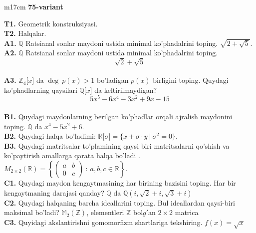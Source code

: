 \documentclass{article}
\begin{document}
\begin{tabular}{m{17cm}}
\textbf{75-variant}
\newline

\textbf{T1.} Geometrik konstruksiyasi. \\
\textbf{T2.} Halqalar. \\
\textbf{A1.} \(\mathbb{Q}\) Ratsianal sonlar maydoni ustida minimal ko'phadalrini toping.
\(\sqrt{2 + \sqrt{5}}\). \\
\textbf{A2.} \(\mathbb{Q}\) Ratsianal sonlar maydoni ustida minimal ko'phadalrini toping.
\[\sqrt{2} + \sqrt{5}\] \\
\textbf{A3.} \(\mathbb{Z}_{4}\lbrack x\rbrack\) da \(\deg\ p(x) > 1\) bo'ladigan \(p(x)\) birligini toping. Quydagi ko'phadlarning qaysilari \(\mathbb{Q\lbrack}x\rbrack\) da keltirilmaydigan?
\[5x^{5} - 6x^{4} - 3x^{2} + 9x - 15\] \\
\textbf{B1.} Quydagi maydonlarning berilgan ko'phadlar orqali ajralish maydonini toping.
\(\mathbb{Q}\) da \(x^{4} - 5x^{2} + 6\). \\
\textbf{B2.} Quydagi halqa bo'ladimi:
\(\mathbb{R\lbrack}\sigma\rbrack = \{ x + \sigma \cdot y\ |\ \sigma^{2} = 0\}\). \\
\textbf{B3.} Quydagi matritsalar to'plamining qaysi biri matritsalarni qo'shish va ko'paytirish amallarga qarata halqa bo'ladi .
\(M_{2 \times 2}\mathbb{(R) =}\left\{ \begin{pmatrix}
a & b \\
0 & c
\end{pmatrix}\ :\ a,b,c \in \mathbb{R} \right\}\). \\
\textbf{C1.} Quydagi maydon kengaytmasining har birining bazisini toping. Har bir kengaytmaning darajasi qanday?
\(\mathbb{Q}\) da \(\mathbb{Q}\left( i,\sqrt{2} + i,\sqrt{3} + i \right)\) \\
\textbf{C2.} Quydagi halqaning barcha ideallarini toping. Bul ideallardan qaysi-biri maksimal bo'ladi?
\(\mathbb{M}_{2}\left( \mathbb{Z} \right)\), elementleri \(\mathbb{Z}\) bol\(g'\)an \(2 \times 2\) matrica \\
\textbf{C3.} Quyidagi akslantirishni gomomorfizm shartlariga tekshiring. \(f(x) = \sqrt{x}\) \\

\end{tabular}
\vspace{1cm}
\end{document}
